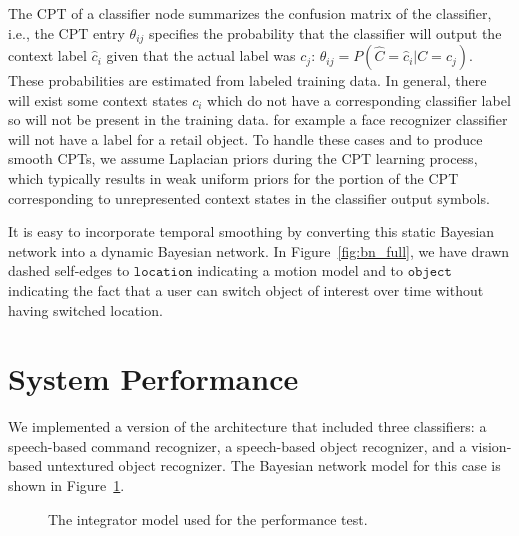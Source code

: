 \documentclass{llncs}
\begin{document}
The CPT of a classifier node summarizes the confusion matrix of the
classifier, i.e., the CPT entry $\theta_{ij}$ specifies the
probability that the classifier will output the context label
$\hat{c}_i$ given that the actual label was $c_j$:
$\theta_{ij}=P(\hat{C}=\hat{c}_i|C=c_j)$.  These probabilities are
estimated from labeled training data. In general, there will exist
some context states $c_i$ which do not have a corresponding classifier
label so will not be present in the training data.  for example a face
recognizer classifier will not have a label for a retail object. To
handle these cases and to produce smooth CPTs, we assume Laplacian
priors during the CPT learning process, which typically results in
weak uniform priors for the portion of the CPT corresponding to
unrepresented context states in the classifier output symbols. 

It is easy to incorporate temporal smoothing by converting this static
Bayesian network into a dynamic Bayesian network. In
Figure~\ref{fig:bn_full}, we have drawn dashed self-edges to $\texttt{location}$
indicating a motion model and to $\texttt{object}$ indicating the fact that a
user can switch object of interest over time without having switched
location.

\section{System Performance}
We implemented a version of the architecture that included three classifiers: a
speech-based command recognizer, a speech-based object recognizer, and
a vision-based untextured object recognizer.  The Bayesian network model for this case is shown in Figure~\ref{fig:bn_poc}.
\begin{figure}
\caption{The integrator model used for the performance test.}
\label{fig:bn_poc}
\end{figure}
\end{document}
